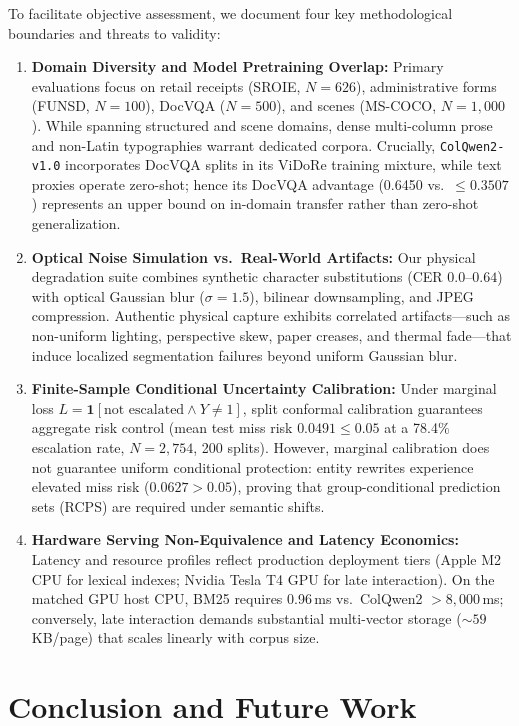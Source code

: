 To facilitate objective assessment, we document four key methodological boundaries and threats to validity:
\begin{enumerate}
    \setlength{\itemsep}{0.2pt plus 0.1pt}
    \setlength{\parskip}{0pt}
    \item \textbf{Domain Diversity and Model Pretraining Overlap:} Primary evaluations focus on retail receipts (SROIE, $N=626$), administrative forms (FUNSD, $N=100$), DocVQA ($N=500$), and scenes (MS-COCO, $N=1{,}000$). While spanning structured and scene domains, dense multi-column prose and non-Latin typographies warrant dedicated corpora. Crucially, \texttt{ColQwen2-v1.0} \cite{faysse2024colqwen2} incorporates DocVQA splits in its ViDoRe training mixture, while text proxies operate zero-shot; hence its DocVQA advantage (0.6450 vs.\ $\le 0.3507$) represents an upper bound on in-domain transfer rather than zero-shot generalization.
    \item \textbf{Optical Noise Simulation vs.\ Real-World Artifacts:} Our physical degradation suite combines synthetic character substitutions (CER $0.0$--$0.64$) with optical Gaussian blur ($\sigma=1.5$), bilinear downsampling, and JPEG compression. Authentic physical capture exhibits correlated artifacts---such as non-uniform lighting, perspective skew, paper creases, and thermal fade---that induce localized segmentation failures beyond uniform Gaussian blur.
    \item \textbf{Finite-Sample Conditional Uncertainty Calibration:} Under marginal loss $L = \mathbf{1}[\text{not escalated} \land Y \ne 1]$, split conformal calibration guarantees aggregate risk control (mean test miss risk $0.0491 \le 0.05$ at a 78.4\% escalation rate, $N=2{,}754$, 200 splits). However, marginal calibration does not guarantee uniform conditional protection: entity rewrites experience elevated miss risk ($0.0627 > 0.05$), proving that group-conditional prediction sets (RCPS) are required under semantic shifts.
    \item \textbf{Hardware Serving Non-Equivalence and Latency Economics:} Latency and resource profiles reflect production deployment tiers (Apple M2 CPU for lexical indexes; Nvidia Tesla T4 GPU for late interaction). On the matched GPU host CPU, BM25 requires 0.96\,ms vs.\ ColQwen2 $>8{,}000$\,ms; conversely, late interaction demands substantial multi-vector storage ($\sim 59$\,KB/page) that scales linearly with corpus size.
\end{enumerate}

\section{Conclusion and Future Work}
\label{sec:conclusion}

